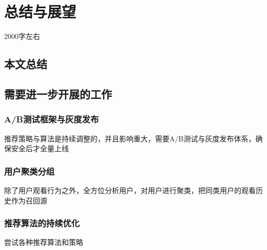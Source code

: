 \chapter{总结与展望}
2000字左右

\section{本文总结}
\section{需要进一步开展的工作}
\subsection{A/B测试框架与灰度发布}
推荐策略与算法是持续调整的，并且影响重大，需要A/B测试与灰度发布体系，确保安全后才全量上线
\subsection{用户聚类分组}
除了用户观看行为之外，全方位分析用户，对用户进行聚类，把同类用户的观看历史作为召回源
\subsection{推荐算法的持续优化}
尝试各种推荐算法和策略
